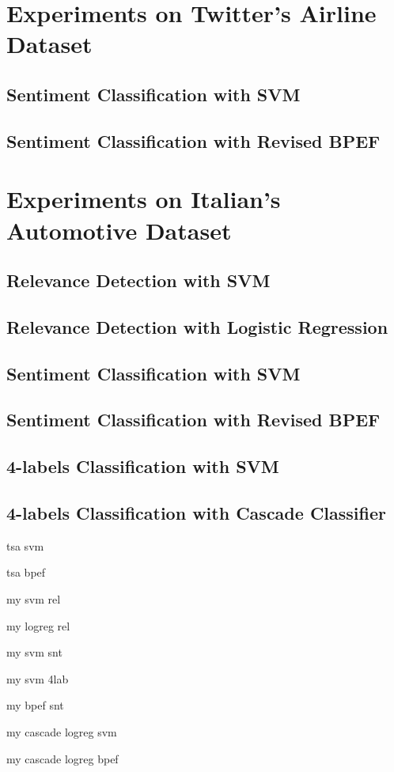 \section{Experiments on Twitter's Airline Dataset}

\subsection{Sentiment Classification with SVM}

\subsection{Sentiment Classification with Revised BPEF}


\section{Experiments on Italian's Automotive Dataset}

\subsection{Relevance Detection with SVM}

\subsection{Relevance Detection with Logistic Regression}

\subsection{Sentiment Classification with SVM}

\subsection{Sentiment Classification with Revised BPEF}

\subsection{4-labels Classification with SVM}

\subsection{4-labels Classification with Cascade Classifier}



tsa svm

tsa bpef

my svm rel

my logreg rel

my svm snt

my svm 4lab

my bpef snt

my cascade logreg svm

my cascade logreg bpef